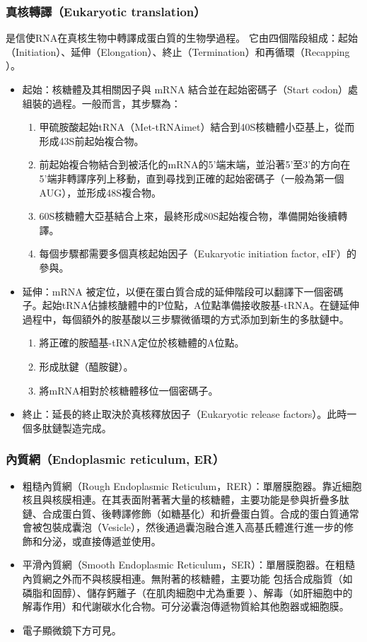 \documentclass[a4paper,12pt]{report}
\begin{document}
\subsubsection{真核轉譯（Eukaryotic translation）}
是信使RNA在真核生物中轉譯成蛋白質的生物學過程。 它由四個階段組成：起始（Initiation）、延伸（Elongation）、終止（Termination）和再循環（Recapping ）。
  \begin{itemize}
    \item 起始：核糖體及其相關因子與 mRNA 結合並在起始密碼子（Start codon）處組裝的過程。一般而言，其步驟為：
    \begin{enumerate}[label=\Roman*.]
    \item 甲硫胺酸起始tRNA（Met-tRNAimet）結合到40S核糖體小亞基上，從而形成43S前起始複合物。
    \item 前起始複合物結合到被活化的mRNA的5'端末端，並沿著5'至3'的方向在5'端非轉譯序列上移動，直到尋找到正確的起始密碼子（一般為第一個AUG），並形成48S複合物。
    \item 60S核糖體大亞基結合上來，最終形成80S起始複合物，準備開始後續轉譯。
    \item 每個步驟都需要多個真核起始因子（Eukaryotic initiation factor, eIF）的參與。
    \end{enumerate}
    \item 延伸：mRNA 被定位，以便在蛋白質合成的延伸階段可以翻譯下一個密碼子。起始tRNA佔據核醣體中的P位點，A位點準備接收胺基-tRNA。在鏈延伸過程中，每個額外的胺基酸以三步驟微循環的方式添加到新生的多肽鏈中。
    \begin{enumerate}[label=\Roman*.]
    \item 將正確的胺醯基-tRNA定位於核糖體的A位點。
    \item 形成肽鍵（醯胺鍵）。
    \item 將mRNA相對於核糖體移位一個密碼子。
    \end{enumerate}
    \item 終止：延長的終止取決於真核釋放因子（Eukaryotic release factors）。此時一個多肽鏈製造完成。
\end{itemize}
\subsubsection{內質網（Endoplasmic reticulum, ER）}
\begin{itemize}
  \item 粗糙內質網（Rough Endoplasmic Reticulum，RER）：單層膜胞器。靠近細胞核且與核膜相連。在其表面附著著大量的核糖體，主要功能是參與折疊多肽鏈、合成蛋白質、後轉譯修飾（如糖基化）和折疊蛋白質。合成的蛋白質通常會被包裝成囊泡（Vesicle），然後通過囊泡融合進入高基氏體進行進一步的修飾和分泌，或直接傳遞並使用。
  \item 平滑內質網（Smooth Endoplasmic Reticulum，SER）：單層膜胞器。在粗糙內質網之外而不與核膜相連。無附著的核糖體，主要功能 包括合成脂質（如磷脂和固醇）、儲存鈣離子（在肌肉細胞中尤為重要 ）、解毒（如肝細胞中的解毒作用）和代謝碳水化合物。可分泌囊泡傳遞物質給其他胞器或細胞膜。
  \item 電子顯微鏡下方可見。
\end{itemize}
\end{document}
